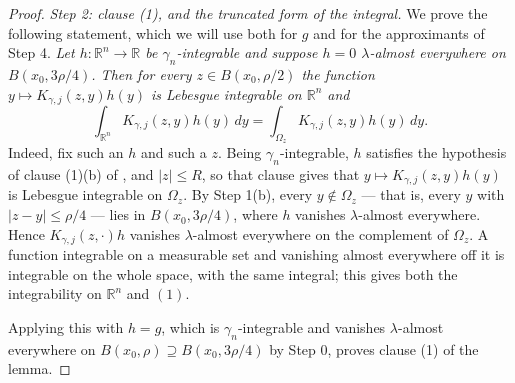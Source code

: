 \begin{proof}
\emph{Step 2: clause (1), and the truncated form of the integral.}
We prove the following statement, which we will use both for $g$ and for the
approximants of Step 4.  \emph{Let $h : \mathbb{R}^n \to \mathbb{R}$ be
$\gamma_n$-integrable and suppose $h = 0$ $\lambda$-almost everywhere on
$B(x_0,3\rho/4)$.  Then for every $z \in B(x_0,\rho/2)$ the function
$y \mapsto K_{\gamma,j}(z,y)h(y)$ is Lebesgue integrable on $\mathbb{R}^n$ and}
\begin{equation*}
  \int_{\mathbb{R}^n}K_{\gamma,j}(z,y)h(y)\,dy
    = \int_{\Omega_z}K_{\gamma,j}(z,y)h(y)\,dy . \tag{1}
\end{equation*}
Indeed, fix such an $h$ and such a $z$.  Being $\gamma_n$-integrable, $h$
satisfies the hypothesis of clause (1)(b) of
, and $|z| \leq R$, so that clause gives
that $y \mapsto K_{\gamma,j}(z,y)h(y)$ is Lebesgue integrable on $\Omega_z$.
By Step 1(b), every $y \notin \Omega_z$ --- that is, every $y$ with
$|z-y| \leq \rho/4$ --- lies in $B(x_0,3\rho/4)$, where $h$ vanishes
$\lambda$-almost everywhere.  Hence
$K_{\gamma,j}(z,\cdot)h$ vanishes $\lambda$-almost everywhere on the complement
of $\Omega_z$.  A function integrable on a measurable set and vanishing almost
everywhere off it is integrable on the whole space, with the same integral;
this gives both the integrability on $\mathbb{R}^n$ and $(1)$.

Applying this with $h = g$, which is $\gamma_n$-integrable and vanishes
$\lambda$-almost everywhere on $B(x_0,\rho) \supseteq B(x_0,3\rho/4)$ by
Step 0, proves clause (1) of the lemma.


\end{proof}
